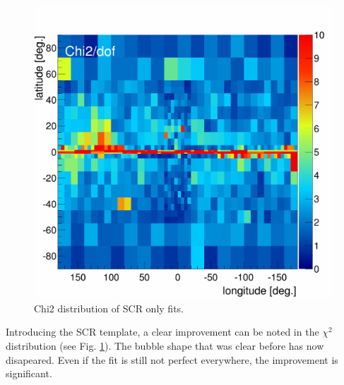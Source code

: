 \begin{figure}[h]
  	\centering
	\includegraphics[width=.9\linewidth]{pic/results/SCRonly_Chi2Distribution.png}
  	\caption{Chi2 distribution of SCR only fits.}
  	\label{fig:SCRonly_fit}
\end{figure}

Introducing the SCR template, a clear improvement can be noted in the $\chi^2$ distribution (see Fig. \ref{fig:SCRonly_fit}). The bubble shape that was clear before has now disapeared. Even if the fit is still not perfect everywhere, the improvement is significant.

